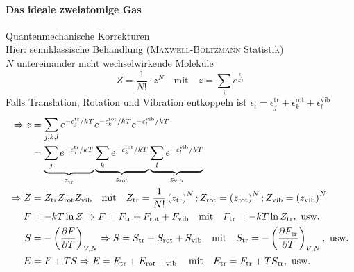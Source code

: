 \paragraph{Das ideale zweiatomige Gas} Quantenmechanische Korrekturen \\
\underline{Hier}: semiklassische Behandlung (\textsc{Maxwell-Boltzmann} Statistik) \\
$N$ untereinander nicht wechselwirkende Moleküle
\begin{equation}
    Z = \frac{1}{N!} \cdot z^N \quad \text{mit} \quad z = \sum_i e^{\frac{\epsilon_i}{k T}}
\end{equation}
Falls Translation, Rotation und Vibration entkoppeln ist $\epsilon_i = \epsilon_j^\text{tr} + \epsilon_k^\text{rot} + \epsilon_l^\text{vib}$
\begin{equation}
    \begin{split}
        \Rightarrow z &= \sum_{j, k, l} e^{-\epsilon_j^\text{tr} / kT} e^{-\epsilon_k^\text{rot} / kT} e^{-\epsilon_l^\text{vib} / kT} \\
        &= \underbrace{\sum_j e^{-\epsilon_j^\text{tr} / kT}}_{z_\text{tr}} \underbrace{\sum_k e^{-\epsilon_k^\text{rot} / kT}}_{z_\text{rot}} \underbrace{\sum_l e^{-\epsilon_l^\text{vib} / kT}}_{z_\text{vib}} \\
        \Rightarrow Z &= Z_\text{tr} Z_\text{rot} Z_\text{vib} \quad \text{mit} \quad Z_\text{tr} = \frac{1}{N!} \left( z_\text{tr} \right)^N; Z_\text{rot} = \left( z_\text{rot} \right)^N; Z_\text{vib} = \left( z_\text{vib} \right)^N \\
        F &= - k T \ln Z \Rightarrow F = F_\text{tr} + F_\text{rot} + F_\text{vib} \quad \text{mit} \quad F_\text{tr} = - k T \ln Z_\text{tr}, \text{ usw.} \\
        S &= - \left( \frac{\partial F}{\partial T} \right)_{V, N} \Rightarrow S = S_\text{tr} + S_\text{rot} + S_\text{vib} \quad \text{mit} \quad S_\text{tr} = - \left( \frac{\partial F_\text{tr}}{\partial T} \right)_{V, N}, \text{ usw.} \\
        E &= F + T S \Rightarrow E = E_\text{tr} + E_\text{rot} + _\text{vib} \quad \text{mit} \quad E_\text{tr} = F_\text{tr} + T S_\text{tr}, \text{ usw.}
    \end{split}
\end{equation}
